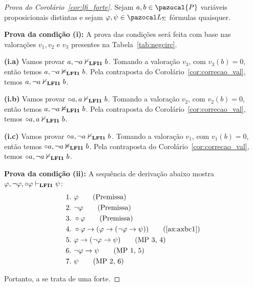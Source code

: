         \begin{proof}[Prova do Corolário~\ref{cor:lfi_forte}]
            Sejam $a, b \in \pazocal{P}$ variáveis proposicionais distintas e sejam $\phi, \psi \in \ling{}$ fórmulas quaisquer.

            \begin{adjustwidth}{1cm}{}

                \noindent\textbf{Prova da condição (i):} A prova das condições será feita com base nas valorações $v_1, v_2$ e $v_3$ presentes na Tabela~\ref{tab:negcirc}.
        
                \begin{adjustwidth}{1cm}{}

                    \textbf{(i.a)} Vamos provar $a, \neg a \nvdash_{{\normalfont\textbf{LFI1}}{}} b$. Tomando a valoração $v_3$, com $v_3(b) = 0$, então temos $a, \neg a \nvDash_{{\normalfont\textbf{LFI1}}{}} b$. Pela contraposta do Corolário~\ref{cor:correcao_val}, temos  $a, \neg a \nvdash_{{\normalfont\textbf{LFI1}}{}} b$.

                    \noindent\textbf{(i.b)} Vamos provar $\circ a, a \nvdash_{{\normalfont\textbf{LFI1}}{}} b$. Tomando a valoração $v_2$, com $v_2(b) = 0$, então temos $a, \neg a \nvDash_{{\normalfont\textbf{LFI1}}{}} b$. Pela contraposta do Corolário~\ref{cor:correcao_val}, temos $\circ a, a \nvdash_{{\normalfont\textbf{LFI1}}{}} b$.

                    \noindent\textbf{(i.c)} Vamos provar $\circ a, \neg a \nvdash_{{\normalfont\textbf{LFI1}}{}} b$. Tomando a valoração $v_1$, com $v_1(b) = 0$, então temos $\circ a, \neg a \nvDash_{{\normalfont\textbf{LFI1}}{}} b$. Pela contraposta do Corolário~\ref{cor:correcao_val}, temos $\circ a, \neg a \nvdash_{{\normalfont\textbf{LFI1}}{}} b$.
                \end{adjustwidth}
        
                \noindent\textbf{Prova da condição (ii):} A sequência de derivação abaixo mostra $\varphi, \neg \varphi, \circ \varphi \vdash_{{\normalfont\textbf{LFI1}}{}} \psi$:
                \begin{align*}
                    1.~ & \phi \tag{Premissa}       \\
                    2.~ & \neg \phi \tag{Premissa}  \\
                    3.~ & \circ \phi \tag{Premissa} \\
                    4.~ & \circ \phi \to (\phi \to (\neg \phi \to \psi)) \tag{\ref{ax:axbc1}} \\
                    5.~ & \phi \to (\neg \phi \to \psi) \tag{MP 3, 4} \\
                    6.~ & \neg \phi \to \psi \tag{MP 1, 5} \\
                    7.~ & \psi \tag{MP 2, 6}
                \end{align*}

            \end{adjustwidth}


            Portanto, a \lfium{} se trata de uma \lfi{} forte.
        \end{proof}

